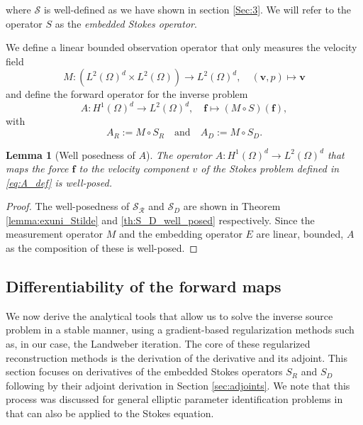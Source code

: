 \documentclass[final,leqno]{scrarticle}
\newtheorem{lemma}[theorem]{Lemma}
\newcommand{\lzo}{L^2(\Omega)}
\newcommand{\Hd}{{H^1(\Omega)^d}}
\newcommand{\lzd}{{L^2(\Omega)^d}}
\begin{document}
where $\mathcal{S}$ is well-defined as we have shown in section \ref{Sec:3}.
We will refer to the operator $S$ as the \emph{embedded Stokes operator}.

We define a linear bounded observation operator that only measures the velocity field
\begin{displaymath}
    M : \left( \lzd \times \lzo \right) \rightarrow \lzd , \quad(\mathbf{v}, p ) \mapsto \mathbf{v}
\end{displaymath}
and define the forward operator for the inverse problem
\begin{equation}
    A : \Hd \rightarrow \lzd , \quad\mathbf{f} \mapsto \left( M \circ S \right)(\mathbf{f})  ,
    \label{eq:A_def}
\end{equation}
with
\begin{equation}\label{A}
    A_R := M\circ S_R \quad \text{and} \quad A_D:=M \circ S_D.
\end{equation}

\begin{lemma}[Well posedness of $A$]
    The operator $A : \Hd \rightarrow \lzd$ that maps the force $\mathbf{f}$ to the velocity component $v$ of the Stokes problem defined in \eqref{eq:A_def} is well-posed.
\end{lemma}
\begin{proof}
   The well-posedness of $\mathcal{S_R}$ and $\mathcal{S}_D$ are shown in Theorem \ref{lemma:exuni_Stilde} and \ref{th:S_D_well_posed} respectively. 
   Since the measurement operator $M$ and the embedding operator $E$ are linear, bounded, $A$ as the composition of these is well-posed.
\end{proof}

\subsection{Differentiability of the forward maps}

We now derive the analytical tools that allow us to solve the inverse source problem in a stable manner, using a gradient-based regularization methods such as, in our case, the Landweber iteration. %
The core of these  regularized reconstruction methods is the derivation of the derivative and its adjoint. 
This section focuses on derivatives of the embedded Stokes operators $S_R$ and $S_D$ following by their adjoint derivation in Section \ref{sec:adjoints}.
We note that this process was discussed for general elliptic parameter identification problems in \cite{Hoffmann2022} that can also be applied to the Stokes equation. 
\end{document}

